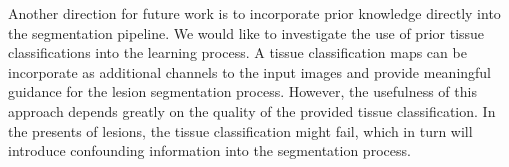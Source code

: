 
Another direction for future work is to incorporate prior knowledge directly
into the segmentation pipeline. We would like to investigate the use of prior
tissue classifications into the learning process. A tissue classification maps can be
incorporate as additional channels to the input images and provide meaningful
guidance for the lesion segmentation process. However, the usefulness of this
approach depends greatly on the quality of the provided tissue classification.
In the presents of lesions, the tissue classification might fail, which in turn
will introduce confounding information into the segmentation process.

